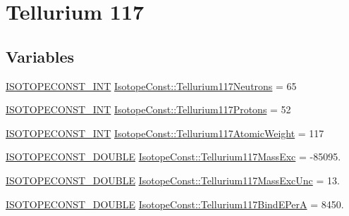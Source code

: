 \hypertarget{group___isotope_const-_tellurium-_te117}{}\section{Tellurium 117}
\label{group___isotope_const-_tellurium-_te117}
\subsection*{Variables}
\begin{DoxyCompactItemize}
\item 
\mbox{\hyperlink{group___isotope_const-_macros_ga5f18360b3e99483a35c32d789e62621c}{I\+S\+O\+T\+O\+P\+E\+C\+O\+N\+S\+T\+\_\+\+I\+NT}} \mbox{\hyperlink{group___isotope_const-_tellurium-_te117_ga3783ef1cf7ea872ebb752caca733847f}{Isotope\+Const\+::\+Tellurium117\+Neutrons}} = 65
\item 
\mbox{\hyperlink{group___isotope_const-_macros_ga5f18360b3e99483a35c32d789e62621c}{I\+S\+O\+T\+O\+P\+E\+C\+O\+N\+S\+T\+\_\+\+I\+NT}} \mbox{\hyperlink{group___isotope_const-_tellurium-_te117_ga138af6163db6318e963662f8bdef1f54}{Isotope\+Const\+::\+Tellurium117\+Protons}} = 52
\item 
\mbox{\hyperlink{group___isotope_const-_macros_ga5f18360b3e99483a35c32d789e62621c}{I\+S\+O\+T\+O\+P\+E\+C\+O\+N\+S\+T\+\_\+\+I\+NT}} \mbox{\hyperlink{group___isotope_const-_tellurium-_te117_ga0f1979628b629cf03007962374685ae0}{Isotope\+Const\+::\+Tellurium117\+Atomic\+Weight}} = 117
\item 
\mbox{\hyperlink{group___isotope_const-_macros_ga8f45a7272ce02c0b4c65c44636ed719a}{I\+S\+O\+T\+O\+P\+E\+C\+O\+N\+S\+T\+\_\+\+D\+O\+U\+B\+LE}} \mbox{\hyperlink{group___isotope_const-_tellurium-_te117_ga45fd9d8ad1b6f76b0129592f4e880138}{Isotope\+Const\+::\+Tellurium117\+Mass\+Exc}} = -\/85095.
\item 
\mbox{\hyperlink{group___isotope_const-_macros_ga8f45a7272ce02c0b4c65c44636ed719a}{I\+S\+O\+T\+O\+P\+E\+C\+O\+N\+S\+T\+\_\+\+D\+O\+U\+B\+LE}} \mbox{\hyperlink{group___isotope_const-_tellurium-_te117_ga98e6ebdb33b36e3fe0f9247d0c5cafa0}{Isotope\+Const\+::\+Tellurium117\+Mass\+Exc\+Unc}} = 13.
\item 
\mbox{\hyperlink{group___isotope_const-_macros_ga8f45a7272ce02c0b4c65c44636ed719a}{I\+S\+O\+T\+O\+P\+E\+C\+O\+N\+S\+T\+\_\+\+D\+O\+U\+B\+LE}} \mbox{\hyperlink{group___isotope_const-_tellurium-_te117_gac898e4ef95316fb17e9a44cc97a1b48d}{Isotope\+Const\+::\+Tellurium117\+Bind\+E\+PerA}} = 8450.
\item 

\end{DoxyCompactItemize}
